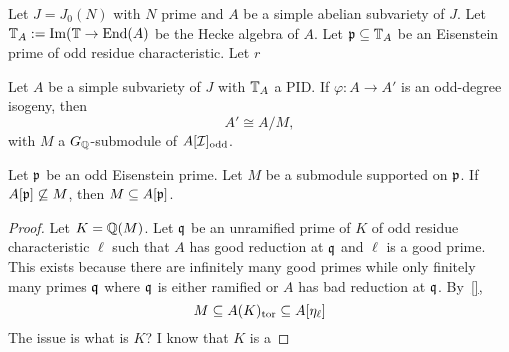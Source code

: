 \documentclass[thesis.tex]{subfiles}
\begin{document}
\begin{proposition}
    Let $J=J_0(N)$ with $N$ prime and $A$ be a simple abelian subvariety of
    $J$. Let $\mathbb{T}_A:=\operatorname{Im} (\mathbb{T}\to \operatorname{End}(A)$ be the Hecke algebra of $A$. Let
    $\mathfrak{p}\subseteq \mathbb{T}_A$ be an Eisenstein prime of odd residue characteristic.
    Let $r$ 
\end{proposition}

\begin{corollary}
    Let $A$ be a simple subvariety of $J$ with $\mathbb{T}_A$ a PID\@. If $\varphi:A\to
    A'$ is an odd-degree isogeny, then
    \[
        A' \cong A/M,
    \]
    with $M$ a $G_{\mathbb{Q}}$-submodule of $A[\mathcal{I}]_{\mathrm{odd}}$.
\end{corollary}

\begin{proposition}
    Let $\mathfrak{p}$ be an odd Eisenstein prime. Let $M$ be a submodule supported on
    $\mathfrak{p}$. If $A[\mathfrak{p}]\not\subseteq M$, then $M\subseteq A[\mathfrak{p}]$.
\end{proposition}
\begin{proof}
    Let $K=\mathbb{Q}(M)$. Let $\mathfrak{q}$ be an unramified prime of $K$ of odd residue characteristic
    $\ell$ such that $A$ has good reduction at $\mathfrak{q}$ and $\ell$ is a good prime.
    This exists because there are infinitely many good primes while only
    finitely many primes $\mathfrak{q}$ where $\mathfrak{q}$ is either ramified or $A$ has bad
    reduction at $\mathfrak{q}$. By~\ref{},
    \[
        M\subseteq A(K)_{\mathrm{tor}} \subseteq A[\eta_\ell]
    \]
    The issue is what is $K$? I know that $K$ is a 
\end{proof}
\end{document}
